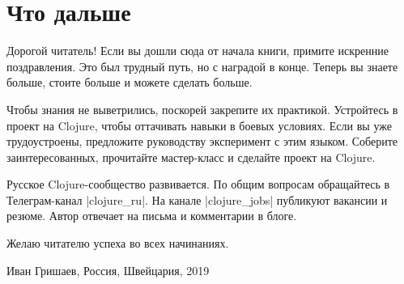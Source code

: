 \chapter{Что дальше}

Дорогой читатель! Если вы дошли сюда от начала книги, примите искренние
поздравления. Это был трудный путь, но с наградой в конце. Теперь вы знаете
больше, стоите больше и можете сделать больше.

Чтобы знания не выветрились, поскорей закрепите их практикой. Устройтесь в
проект на Clojure, чтобы оттачивать навыки в боевых условиях. Если вы уже
трудоустроены, предложите руководству эксперимент с этим языком. Соберите
заинтересованных, прочитайте мастер-класс и сделайте проект на Clojure.

Русское Clojure-сообщество развивается. По общим вопросам обращайтесь в
Телеграм-канал \spverb|clojure_ru|. На канале \spverb|clojure_jobs| публикуют
вакансии и резюме. Автор отвечает на письма и комментарии в блоге.

Желаю читателю успеха во всех начинаниях.

Иван Гришаев,
Россия, Швейцария, 2019
